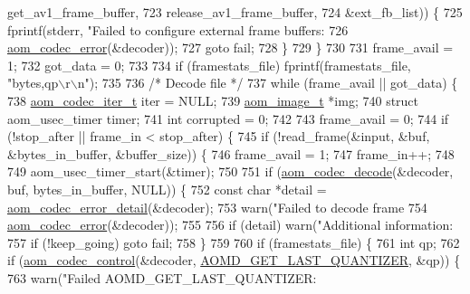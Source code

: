 \begin{DoxyCodeInclude}
{{{{{{{{{{{{{{{{{{{{{{{{{{{{{{{{{{{{{{      get\_av1\_frame\_buffer,
723                                              release\_av1\_frame\_buffer,
724                                              &ext\_fb\_list)) \{
725       fprintf(stderr, \textcolor{stringliteral}{"Failed to configure external frame buffers: %
726               \hyperlink{group__codec_ga50949c0854605c722832bbfb0803f5f4}{aom\_codec\_error}(&decoder));
727       \textcolor{keywordflow}{goto} fail;
728     \}
729   \}
730 
731   frame\_avail = 1;
732   got\_data = 0;
733 
734   \textcolor{keywordflow}{if} (framestats\_file) fprintf(framestats\_file, \textcolor{stringliteral}{"bytes,qp\(\backslash\)r\(\backslash\)n"});
735 
736   \textcolor{comment}{/* Decode file */}
737   \textcolor{keywordflow}{while} (frame\_avail || got\_data) \{
738     \hyperlink{group__codec_gadf9e173c9e02788a9999399edab20a02}{aom\_codec\_iter\_t} iter = NULL;
739     \hyperlink{structaom__image}{aom\_image\_t} *img;
740     \textcolor{keyword}{struct }aom\_usec\_timer timer;
741     \textcolor{keywordtype}{int} corrupted = 0;
742 
743     frame\_avail = 0;
744     \textcolor{keywordflow}{if} (!stop\_after || frame\_in < stop\_after) \{
745       \textcolor{keywordflow}{if} (!read\_frame(&input, &buf, &bytes\_in\_buffer, &buffer\_size)) \{
746         frame\_avail = 1;
747         frame\_in++;
748 
749         aom\_usec\_timer\_start(&timer);
750 
751         \textcolor{keywordflow}{if} (\hyperlink{group__decoder_gab03fdb999d1f83a5896869a3ba5f68f7}{aom\_codec\_decode}(&decoder, buf, bytes\_in\_buffer, NULL)) \{
752           \textcolor{keyword}{const} \textcolor{keywordtype}{char} *detail = \hyperlink{group__codec_ga43a70562598b485685794a4e9d9d53f7}{aom\_codec\_error\_detail}(&decoder);
753           warn(\textcolor{stringliteral}{"Failed to decode frame %
754                \hyperlink{group__codec_ga50949c0854605c722832bbfb0803f5f4}{aom\_codec\_error}(&decoder));
755 
756           \textcolor{keywordflow}{if} (detail) warn(\textcolor{stringliteral}{"Additional information: %
757           \textcolor{keywordflow}{if} (!keep\_going) \textcolor{keywordflow}{goto} fail;
758         \}
759 
760         \textcolor{keywordflow}{if} (framestats\_file) \{
761           \textcolor{keywordtype}{int} qp;
762           \textcolor{keywordflow}{if} (\hyperlink{group__codec_ga6da974f4eeaba1fa74106b28d0fe6ac5}{aom\_codec\_control}(&decoder, 
      \hyperlink{group__aom__decoder_gga3865fd4b3192489baa9a5c3632ebe97baa984acc8b42df9c7d18fc3556a14fd29}{AOMD\_GET\_LAST\_QUANTIZER}, &qp)) \{
763             warn(\textcolor{stringliteral}{"Failed AOMD\_GET\_LAST\_QUANTIZER: %
}}}}}}}}}}}}}}}}}}}}}}}}}}}}}}}}}}}}}}}}}}
\end{DoxyCodeInclude}
